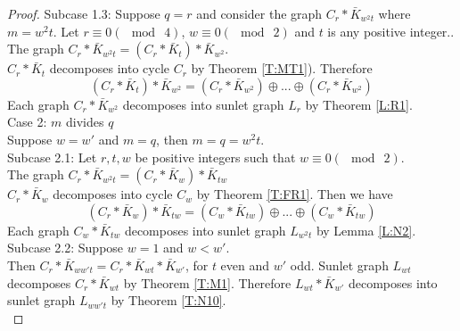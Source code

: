 \documentclass[12pt]{report}
\begin{document}
\begin{proof}
 Subcase 1.3:  Suppose $q=r$ and consider the graph $C_r*\bar{K}_{w^2t}$ where $m=w^2t$. Let  $r\equiv 0(\mod\ 4)$, $w\equiv 0(\mod\ 2)$ and $t$ is any positive integer..\\
 The graph $C_r*\bar{K}_{w^2t}=(C_r*\bar{K}_t)*\bar{K}_{w^2}$.\\ $C_r*\bar{K}_{t}$ decomposes into cycle $C_r$ by Theorem \ref{T:MT1}). Therefore $$(C_r*\bar{K}_t)*\bar{K}_{w^2}=(C_{r}*\bar{K}_{w^2})\oplus...\oplus (C_{r}*\bar{K}_{w^2})$$ Each graph $C_r*\bar{K}_{w^2}$ decomposes into sunlet graph $L_r$ by Theorem \ref{L:R1}.\\
Case 2: $m$ divides $q$\\
 Suppose $w=w'$ and $m=q$, then $m=q=w^2t$.\\
Subcase 2.1:  Let $r,t,w$ be positive integers such that $w\equiv 0(\mod\ 2)$.\\
The graph $C_r*\bar{K}_{w^2t}=(C_r*\bar{K}_w)*\bar{K}_{tw}$\\
$C_r*\bar{K}_w$ decomposes into cycle $C_w$ by Theorem \ref{T:FR1}.
Then we have
$$(C_r*\bar{K}_{w})*\bar{K}_{tw}=(C_{w}*\bar{K}_{tw})\oplus...\oplus
(C_{w}*\bar{K}_{tw})$$
Each graph $C_w*\bar{K}_{tw}$ decomposes into sunlet graph $L_{w^2t}$ by Lemma \ref{L:N2}.\\
Subcase 2.2: Suppose $w=1$ and $w<w'$.\\
Then  $C_r*\bar{K}_{ww't}=C_r*\bar{K}_{wt}*\bar{K}_{w'}$, for $t$ even and $w'$ odd. Sunlet graph $L_{wt}$ decomposes $C_r*\bar{K}_{wt}$ by Theorem \ref{T:M1}. Therefore $L_{wt}*\bar{K}_{w'}$ decomposes into sunlet graph $L_{ww't}$ by Theorem \ref{T:N10}.\\

\end{proof}
\end{document}
